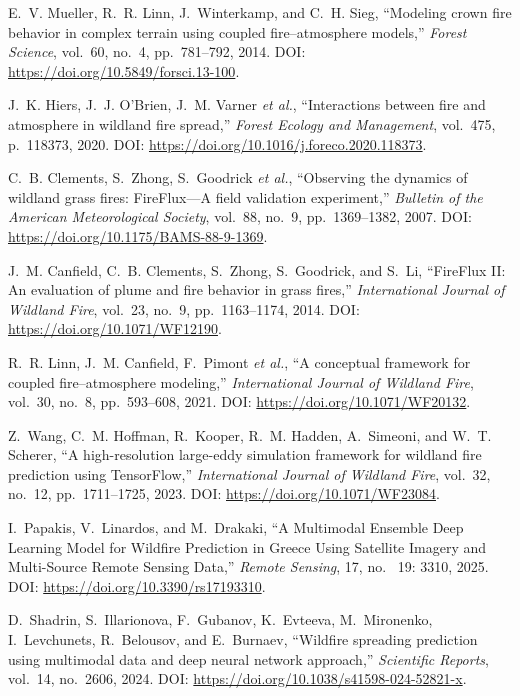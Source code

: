 \documentclass[conference]{IEEEtran}
\begin{document}
\begin{thebibliography}{00}
E.~V. Mueller, R.~R. Linn, J.~Winterkamp, and C.~H. Sieg,
``Modeling crown fire behavior in complex terrain using coupled fire--atmosphere models,''
\emph{Forest Science}, vol.~60, no.~4, pp.~781--792, 2014. DOI: \url{https://doi.org/10.5849/forsci.13-100}.

J.~K. Hiers, J.~J. O’Brien, J.~M. Varner \emph{et al.},
``Interactions between fire and atmosphere in wildland fire spread,''
\emph{Forest Ecology and Management}, vol.~475, p.~118373, 2020. DOI: \url{https://doi.org/10.1016/j.foreco.2020.118373}.

C.~B. Clements, S.~Zhong, S.~Goodrick \emph{et al.},
``Observing the dynamics of wildland grass fires: FireFlux---A field validation experiment,''
\emph{Bulletin of the American Meteorological Society}, vol.~88, no.~9, pp.~1369--1382, 2007. DOI: \url{https://doi.org/10.1175/BAMS-88-9-1369}.

J.~M. Canfield, C.~B. Clements, S.~Zhong, S.~Goodrick, and S.~Li,
``FireFlux II: An evaluation of plume and fire behavior in grass fires,''
\emph{International Journal of Wildland Fire}, vol.~23, no.~9, pp.~1163--1174, 2014. DOI: \url{https://doi.org/10.1071/WF12190}.

R.~R. Linn, J.~M. Canfield, F.~Pimont \emph{et al.},
``A conceptual framework for coupled fire--atmosphere modeling,''
\emph{International Journal of Wildland Fire}, vol.~30, no.~8, pp.~593--608, 2021. DOI: \url{https://doi.org/10.1071/WF20132}.

Z.~Wang, C.~M. Hoffman, R.~Kooper, R.~M. Hadden, A.~Simeoni, and W.~T. Scherer,
``A high-resolution large-eddy simulation framework for wildland fire prediction using TensorFlow,''
\emph{International Journal of Wildland Fire}, vol.~32, no.~12, pp.~1711--1725, 2023. DOI: \url{https://doi.org/10.1071/WF23084}.

I.~Papakis, V.~Linardos, and M.~Drakaki, ``A Multimodal Ensemble Deep Learning Model for Wildfire Prediction in Greece Using Satellite Imagery and Multi-Source Remote Sensing Data,''
\emph{Remote Sensing}, 17, no.~ 19: 3310,  2025. DOI: \url{https://doi.org/10.3390/rs17193310}.

D.~Shadrin, S.~Illarionova, F.~Gubanov, K.~Evteeva, M.~Mironenko, I.~Levchunets, R.~Belousov, and E.~Burnaev, ``Wildfire spreading prediction using multimodal data and deep neural network approach,'' \emph{Scientific Reports}, vol.~14, no.~2606, 2024. DOI: \url{https://doi.org/10.1038/s41598-024-52821-x}.




\end{thebibliography}
\end{document}
